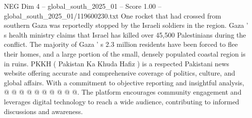 \begin{textsample}{NEG Dim 4 – global\_south\_2025\_01 – Score 1.00 – global\_south\_2025\_01/119600230.txt}
One rocket that had crossed from southern Gaza was reportedly stopped by the Israeli soldiers in the region.
Gaza ' s health ministry claims that Israel has killed over 45,500 Palestinians during the conflict.
The majority of Gaza ' s 2.3 million residents have been forced to flee their homes, and a large portion of the small, densely populated coastal region is in ruins.
PKKH ( Pakistan Ka Khuda Hafiz ) is a respected Pakistani news website offering accurate and comprehensive coverage of politics, culture, and global affairs.
With a commitment to objective reporting and insightful analysis, @ @ @ @ @ @ @ @ @ @.
The platform encourages community engagement and leverages digital technology to reach a wide audience, contributing to informed discussions and awareness.

\end{textsample}
